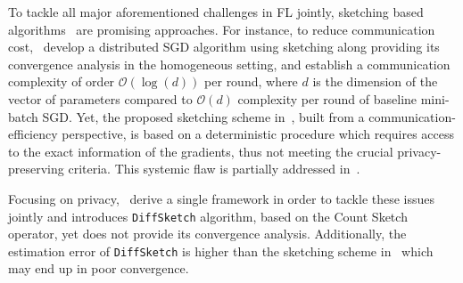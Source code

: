 \documentclass[11pt]{article}
\begin{document}
To tackle all major aforementioned challenges in FL jointly, sketching based algorithms~\citep{DBLP:journals/tcs/CharikarCF04,cormode2005improved,kleinberg2003bursty,Proc:Li_Church_Hastie_NIPS08} 
are promising approaches. 
For instance, to reduce communication cost,~\citep{ivkin2019communication} develop a distributed SGD algorithm using sketching along providing its convergence analysis in the homogeneous setting, and establish a communication complexity of order $\mathcal{O}(\log(d))$ per round, where $d$ is the dimension of the vector of parameters compared to $\mathcal{O}(d)$ complexity per round of baseline mini-batch SGD. Yet, the proposed sketching scheme in~\citet{ivkin2019communication}, built from a communication-efficiency perspective, is based on a deterministic procedure which requires access to the exact information of the gradients, thus not meeting the crucial privacy-preserving criteria.
This systemic flaw is partially addressed in~\citet{rothchild2020fetchsgd}. 


Focusing on privacy,~\citep{li2019privacy} derive a single framework in order to tackle these issues jointly and introduces \texttt{DiffSketch} algorithm, based on the Count Sketch operator, yet does not provide its convergence analysis.
Additionally, the estimation error of \texttt{DiffSketch} is higher than the sketching scheme in~\citet{ivkin2019communication} which may end up in poor convergence. 
 
\end{document}
